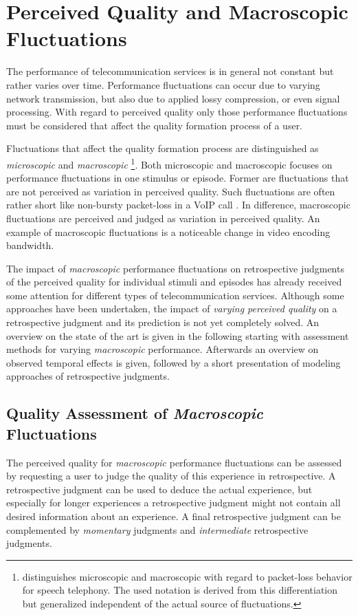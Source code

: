 \section{Perceived Quality and Macroscopic Fluctuations}\label{chap:04}
The performance of telecommunication services is in general not constant but rather varies over time.
Performance fluctuations can occur due to varying network transmission, but also due to applied lossy compression, or even signal processing.
With regard to perceived quality only those performance fluctuations must be considered that affect the quality formation process of a user.

Fluctuations that affect the quality formation process are distinguished as \emph{microscopic} and \emph{macroscopic} \citep[\cf,][p.~72]{raake_short-_2006}
\footnote{\citet{raake_short-_2006} distinguishes microscopic and macroscopic with regard to packet-loss behavior for speech telephony. The used notation is derived from this differentiation but generalized independent of the actual source of fluctuations.}.
Both microscopic and macroscopic focuses on performance fluctuations in one stimulus or episode.
Former are fluctuations that are not perceived as variation in perceived quality.
Such fluctuations are often rather short like non-bursty packet-loss in a \ac{VoIP} call \citep[\cf,][p.~72]{raake_short-_2006}.
In difference, macroscopic fluctuations are perceived and judged as variation in perceived quality.
An example of macroscopic fluctuations is a noticeable change in video encoding bandwidth.

The impact of \emph{macroscopic} performance fluctuations on retrospective judgments of the perceived quality for individual stimuli and episodes has already received some attention for different types of telecommunication services.
Although some approaches have been undertaken, the impact of \emph{varying perceived quality} on a retrospective judgment and its prediction is not yet completely solved.
An overview on the state of the art is given in the following starting with assessment methods for varying \emph{macroscopic} performance.
Afterwards an overview on observed temporal effects is given, followed by a short presentation of modeling approaches of retrospective judgments.

\subsection{Quality Assessment of \emph{Macroscopic} Fluctuations}
The perceived quality for \emph{macroscopic} performance fluctuations can be assessed by requesting a user to judge the quality of this experience in retrospective.
A retrospective judgment can be used to deduce the actual experience, but especially for longer experiences a retrospective judgment might not contain all desired information about an experience.
A final retrospective judgment can be complemented by \emph{momentary} judgments and \emph{intermediate} retrospective judgments.

